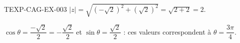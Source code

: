 \begin{corrige}{TEXP-CAG-EX-003}
$|z| = \sqrt{(-\sqrt2)^2+(\sqrt2)^2} = \sqrt{2+2} = 2$.

$\cos\theta = \dfrac{-\sqrt2}{2} = -\dfrac{\sqrt2}{2}$ et $\sin\theta = \dfrac{\sqrt2}{2}$ : ces valeurs correspondent à $\theta = \dfrac{3\pi}{4}$.
\end{corrige}
